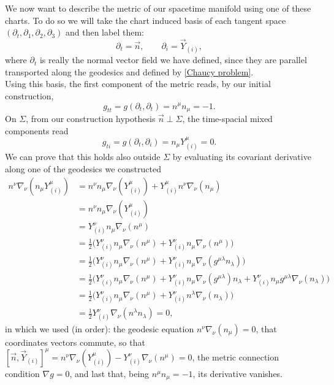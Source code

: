 We now want to describe the metric of our spacetime manifold using one of these charts. To do so we will take the chart induced basis of each tangent space $(\partial_t,\partial_1,\partial_2,\partial_3)$ and then label them:
\begin{equation}
    \partial_t=\vec n,\qquad \partial_i= \vec Y_{(i)},
\end{equation}
where $\partial_t$ is really the normal vector field we have defined, since they are parallel transported along the geodesics and defined by \eqref{Chaucy problem}.\\
Using this basis, the first component of the metric reads, by our initial construction,
\begin{equation}
    g_{tt}=g(\partial_t,\partial_t)=n^\mu n_\mu=-1.\label{gen gtt}
\end{equation} 
On $\Sigma$, from our construction hypothesis $\vec{n}\perp\Sigma $, the time-spacial mixed components read 
\begin{equation}
    g_{ti}=g(\partial_t,\partial_i)=n_\mu Y^\mu_{(i)}=0.\label{gen gti}
\end{equation} 
We can prove that this holds also outside $\Sigma$ by evaluating its covariant derivative along one of the geodesics we constructed
\begin{align*}
    n^\nu\nabla_\nu(n_\mu Y_{(i)}^\mu)&=n^\nu n_\mu \nabla_\nu( Y_{(i)}^\mu)+Y_{(i)}^\mu n^\nu  \nabla_\nu(n_\mu )\\
    &=n^\nu n_\mu \nabla_\nu( Y_{(i)}^\mu)\\
    &=Y^\nu_{(i)}n_\mu\nabla_\nu(n^\mu)\\
    &=\frac{1}{2}\big(Y^\nu_{(i)}n_\mu\nabla_\nu(n^\mu)+Y^\nu_{(i)}n_\mu\nabla_\nu(n^\mu)\big)\\
    &=\frac{1}{2}\big(Y^\nu_{(i)}n_\mu\nabla_\nu(n^\mu)+Y^\nu_{(i)}n_\mu\nabla_\nu(g^{\mu\lambda}n_{\lambda})\big)\\
    &=\frac{1}{2}\big(Y^\nu_{(i)}n_\mu\nabla_\nu(n^\mu)+Y^\nu_{(i)}n_\mu\nabla_\nu(g^{\mu\lambda})n_{\lambda}+Y^\nu_{(i)}n_\mu g^{\mu\lambda}\nabla_\nu(n_{\lambda})\big)\\
    &=\frac{1}{2}\big(Y^\nu_{(i)}n_\mu\nabla_\nu(n^\mu)+Y^\nu_{(i)}n^\lambda\nabla_\nu(n_{\lambda})\big)\\
    &=\frac{1}{2}Y^\nu_{(i)}\nabla_\nu(n^\lambda n_\lambda)=0,
\end{align*}
in which we used (in order): the geodesic equation $n^\nu  \nabla_\nu(n_\mu )=0$, that coordinates vectors commute, so that $[\vec n,\vec Y_{(i)}]^\mu=n^\nu \nabla_\nu( Y_{(i)}^\mu)-Y^\nu_{(i)}\nabla_\nu(n^\mu)=0$, the metric connection condition $\nabla g=0$, and last that, being $n^\mu n_\mu=-1$, its derivative vanishes.\\
